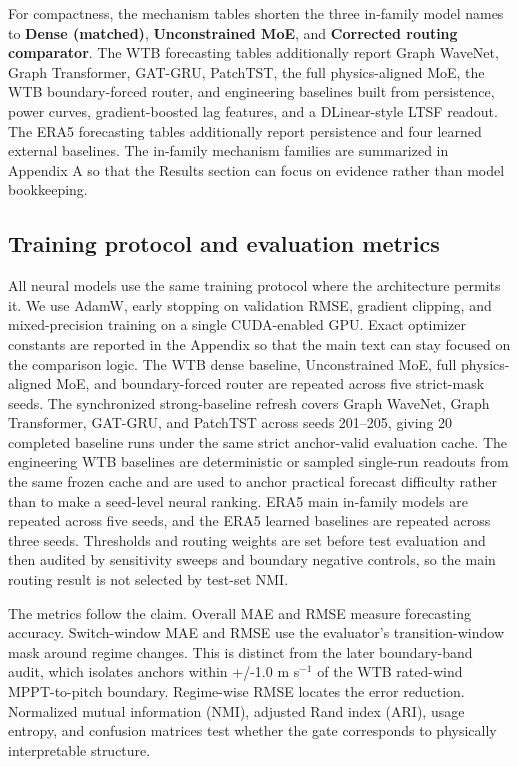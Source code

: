 \documentclass[
  11pt]{article}
\begin{document}
For compactness, the mechanism tables shorten the three in-family model
names to \textbf{Dense (matched)}, \textbf{Unconstrained MoE}, and
\textbf{Corrected routing comparator}. The WTB forecasting tables
additionally report Graph WaveNet, Graph Transformer, GAT-GRU, PatchTST,
the full physics-aligned MoE, the WTB boundary-forced router, and
engineering baselines built from persistence, power curves,
gradient-boosted lag features, and a DLinear-style LTSF readout. The
ERA5 forecasting tables additionally report persistence and four learned
external baselines. The in-family mechanism families are summarized in
Appendix A so that the Results section can focus on evidence rather than
model bookkeeping.

\subsection{Training protocol and evaluation
metrics}\label{training-protocol-and-evaluation-metrics}

All neural models use the same training protocol where the architecture
permits it. We use AdamW, early stopping on validation RMSE, gradient
clipping, and mixed-precision training on a single CUDA-enabled GPU.
Exact optimizer constants are reported in the Appendix so that the main
text can stay focused on the comparison logic. The WTB dense baseline,
Unconstrained MoE, full physics-aligned MoE, and boundary-forced router
are repeated across five strict-mask seeds. The synchronized
strong-baseline refresh covers Graph WaveNet, Graph Transformer,
GAT-GRU, and PatchTST across seeds 201--205, giving 20 completed
baseline runs under the same strict anchor-valid evaluation cache. The
engineering WTB baselines are deterministic or sampled single-run
readouts from the same frozen cache and are used to anchor practical
forecast difficulty rather than to make a seed-level neural ranking.
ERA5 main in-family models are repeated across five seeds, and the ERA5
learned baselines are repeated across three seeds. Thresholds and
routing weights are set before test evaluation and then audited by
sensitivity sweeps and boundary negative controls, so the main routing
result is not selected by test-set NMI.

The metrics follow the claim. Overall MAE and RMSE measure forecasting
accuracy. Switch-window MAE and RMSE use the evaluator's
transition-window mask around regime changes. This is distinct from the
later boundary-band audit, which isolates anchors within +/-1.0 m
s\(^{-1}\) of the WTB rated-wind MPPT-to-pitch boundary. Regime-wise
RMSE locates the error reduction. Normalized mutual information (NMI),
adjusted Rand index (ARI), usage entropy, and confusion matrices test
whether the gate corresponds to physically interpretable structure.
\end{document}
